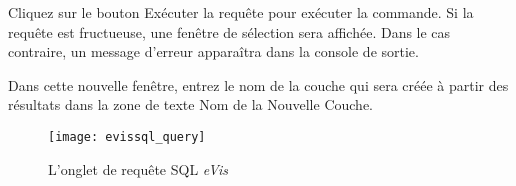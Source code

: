 
Cliquez sur le bouton Exécuter la requête pour exécuter la commande. Si la requête est fructueuse, une fenêtre de sélection sera affichée. Dans le cas contraire, un message d'erreur apparaîtra dans la console de sortie.


Dans cette nouvelle fenêtre, entrez le nom de la couche qui sera créée à partir des résultats dans la zone de texte Nom de la Nouvelle Couche.

\begin{figure}[ht]
   \begin{center}
\caption{\label{evissql_query}L'onglet de requête SQL \emph{eVis} \nixcaption}
\texttt{[image: evissql\_query]}
\end{center}
\end{figure}

